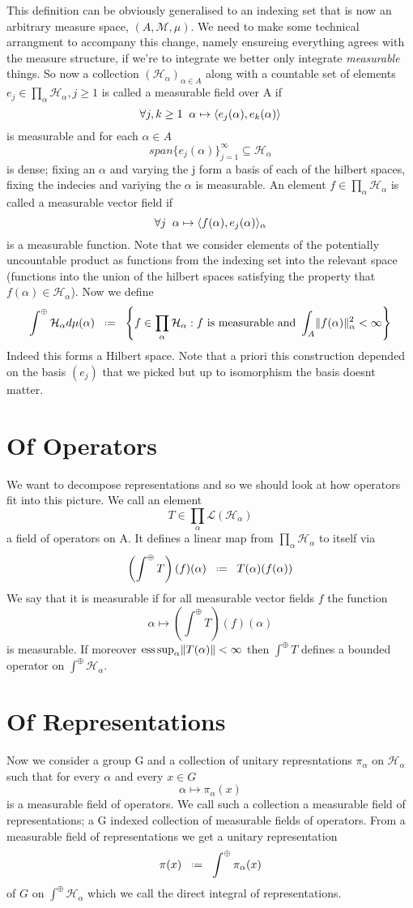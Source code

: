 \documentclass[10pt, openany]{book}
\numberwithin{equation}{section}
\begin{document}
This definition can be obviously generalised to an indexing set that is now an arbitrary measure space, \((A, \mathcal{M}, \mu)\). We need to make some technical arrangment to accompany this change, namely ensureing everything agrees with the measure structure, if we're to integrate we better only integrate \textit{measurable} things. So now a collection \((\mathcal{H}_\alpha)_{\alpha\in A}\) along with a countable set of elements \(e_j \in \prod_\alpha \mathcal{H}_\alpha, j\geq 1\) is called a measurable field over A if 
\[\forall j,k\geq 1 \;\; \alpha \mapsto \langle e_j(\alpha), e_k(\alpha)\rangle\]
is measurable and for each \(\alpha \in A\) 
\[span\{e_j(\alpha)\}_{j=1}^\infty \subseteq \mathcal{H}_\alpha\]
is dense; fixing an \(\alpha\) and varying the j form a basis of each of the hilbert spaces, fixing the indecies and variying the \(\alpha\) is measurable. An element \(f \in \prod_\alpha \mathcal{H}_\alpha\) is called a measurable vector field if 
\[\forall j \;\; \alpha \mapsto \langle f(\alpha), e_j(\alpha)\rangle_\alpha\]
is a measurable function. Note that we consider elements of the potentially uncountable product as functions from the indexing set into the relevant space (functions into the union of the hilbert spaces satisfying the property that \(f(\alpha)\in \mathcal{H}_\alpha\)). Now we define 
\[\int^\oplus \mathcal{H}_\alpha d\mu(\alpha) \defeq \left\{f\in \prod_\alpha \mathcal{H}_\alpha : f \text{ is measurable and } \int_A \norm{f(\alpha)}_\alpha^2 < \infty \right\}\] 
Indeed this forms a Hilbert space. Note that a priori this construction depended on the basis \((e_j)\) that we picked but up to isomorphism the basis doesnt matter. 

\section{Of Operators}
We want to decompose representations and so we should look at how operators fit into this picture. We call an element 
\[T\in \prod_\alpha \mathcal{L(H_\alpha)}\]
a field of operators on A. It defines a linear map from \(\prod_\alpha \mathcal{H}_\alpha\) to itself via 
\[ \left(\int^\oplus T\right)(f)(\alpha) \defeq T(\alpha)(f(\alpha)) \]
We say that it is measurable if for all measurable vector fields \(f\) the function 
\[\alpha \mapsto \left(\int^\oplus T\right)(f)(\alpha)\]
is measurable. If moreover \(\mathrm{ess}\sup_\alpha \lVert T(\alpha) \rVert <\infty\) then \(\int^\oplus T\) defines a bounded operator on \(\int^\oplus \mathcal{H}_\alpha\).

\section{Of Representations}
Now we consider a group G and a collection of unitary represntations \(\pi_\alpha\) on \(\mathcal{H}_\alpha\) such that for every \(\alpha\)  and every \(x\in G\)
\[\alpha \mapsto \pi_\alpha(x)\]
is a measurable field of operators. We call such a collection a measurable field of representations; a G indexed collection of measurable fields of operators. From a measurable field of representations we get a unitary representation 
\[\pi(x) \defeq \int^\oplus \pi_\alpha(x)\]
of \(G\) on \(\int^\oplus \mathcal{H}_\alpha\) which we call the direct integral of representations. 
\end{document}
